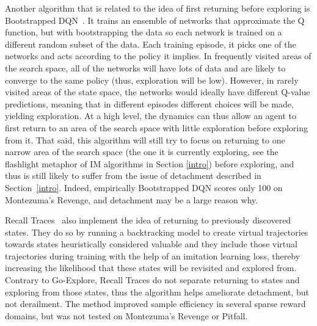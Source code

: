 \documentclass{article}
\begin{document}
Another algorithm that is related to the idea of first returning before exploring is Bootstrapped DQN~\cite{Osband2016DeepEV}. It trains an ensemble of networks that approximate the Q function, but with bootstrapping the data so each network is trained on a different random subset of the data. Each training episode, it picks one of the networks and acts according to the policy it implies. In frequently visited areas of the search space, all of the networks will have lots of data and are likely to converge to the same policy (thus, exploration will be low). However, in rarely visited areas of the state space, the networks would ideally have different Q-value predictions, meaning that in different episodes different choices will be made, yielding exploration. At a high level, the dynamics can thus allow an agent to first return to an area of the search space with little exploration before exploring from it. That said, this algorithm will still try to focus on returning to one narrow area of the search space (the one it is currently exploring, see the flashlight metaphor of IM algorithms in Section \ref{intro}) before exploring, and thus is still likely to suffer from the issue of detachment described in Section~\ref{intro}. Indeed, empirically Bootstrapped DQN scores only 100 on Montezuma's Revenge, and detachment may be a large reason why.

Recall Traces~\cite{Goyal2018RecallTB} also implement the idea of returning to previously discovered states. They do so by running a backtracking model to create virtual trajectories towards states heuristically considered valuable and they include those virtual trajectories during training with the help of an imitation learning loss, thereby increasing the likelihood that these states will be revisited and explored from. Contrary to Go-Explore, Recall Traces do not separate returning to states and exploring from those states, thus the algorithm helps ameliorate detachment, but not derailment. The method improved sample efficiency in several sparse reward domains, but was not tested on Montezuma's Revenge or Pitfall.
\end{document}
